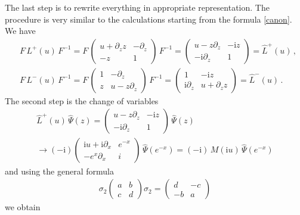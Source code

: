\documentclass[11pt]{article}
\numberwithin{equation}{section}
\theoremstyle{plain}
\theoremstyle{definition}
\def\dd{\partial}
\renewcommand{\imath}{\mathrm{i}}
\begin{document}
The last step is to rewrite 
everything in appropriate representation. 
The procedure is very similar to the calculations 
starting from the formula \eqref{canon}.  
We have
\begin{align*}
	&F\,L^+(u)\,F^{-1} = F\,\left(\begin{array}{cc}
		u + \dd_z z & -\dd_z \\
		-z& 1\end{array}\right)\,F^{-1}  = 
	\left(\begin{array}{cc}
		u - z\partial_z & -\imath z  \\
		-\imath\partial_z & 1\end{array}\right) = \hat{L}^+(u) \,, \\
	&F\,L^-(u)\,F^{-1} = F\,\left(\begin{array}{cc}
		1 & -\dd_z \\
		z& u - z\dd_z \end{array}\right)\,F^{-1}  = 
	\left(\begin{array}{cc}
		1 & -\imath z  \\
		\imath \partial_z & u + \dd_z z\end{array}\right) = \hat{L}^-(u)\,.
\end{align*}
The second step is the change of variables 
\begin{multline*} 
	\hat{L}^+(u)\,\hat{\Psi}(z)  = \left(\begin{array}{cc}
		u - z\partial_z & -\imath z  \\
		-\imath \partial_z & 1\end{array}\right)\,\hat{\Psi}(z) \\
	\longrightarrow (-\imath)\left(\begin{array}{cc}
		\imath u + \imath\partial_x & e^{-x}  \\
		-e^{x}\partial_x & i\end{array}\right)\,\hat{\Psi}(e^{-x}) = 
	(-\imath)\,M(\imath u)\,\hat{\Psi}(e^{-x}) 
\end{multline*}
and using the general formula 
\begin{align*}
	\sigma_2 \left(\begin{array}{cc}
		a & b  \\
		c & d \end{array}\right) \sigma_2 = 
	\left(\begin{array}{cc}
		d & -c  \\
		-b & a \end{array}\right)
\end{align*}
we obtain 
\end{document}
